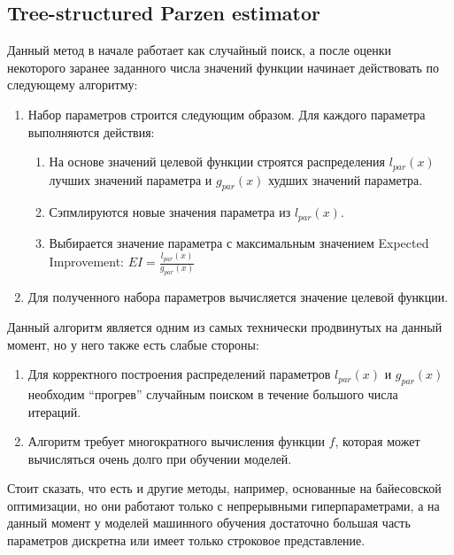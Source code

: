 \documentclass[a4paper,12pt]{article}
\begin{document}
\subsection{Tree-structured Parzen estimator}
Данный метод в начале работает как случайный поиск, а после оценки некоторого заранее заданного числа значений функции начинает действовать по следующему алгоритму:
\begin{enumerate}
    \item Набор параметров строится следующим образом. Для каждого параметра выполняются действия:
    \begin{enumerate}
        \item На основе значений целевой функции строятся распределения $l_{par}(x)$ лучших значений параметра и $g_{par}(x)$ худших значений параметра.
        \item Сэпмлируются новые значения параметра из $l_{par}(x)$.
        \item Выбирается значение параметра с максимальным значением Expected Improvement: $EI = \frac{l_{par}(x)}{g_{par}(x)}$
    \end{enumerate}
    \item Для полученного набора параметров вычисляется значение целевой функции.
    
\end{enumerate}

Данный алгоритм является одним из самых технически продвинутых на данный момент, но у него также есть слабые стороны:
\begin{enumerate}
    \item Для корректного построения распределений параметров $l_{par}(x)$ и $g_{par}(x)$ необходим ``прогрев'' случайным поиском в течение большого числа итераций.
    \item Алгоритм требует многократного вычисления функции $f$, которая может вычисляться очень долго при обучении моделей.
\end{enumerate}

Стоит сказать, что есть и другие методы, например, основанные на байесовской оптимизации, но они работают только с непрерывными гиперпараметрами, а на данный момент у моделей машинного обучения достаточно большая часть параметров дискретна или имеет только строковое представление.
\end{document}
